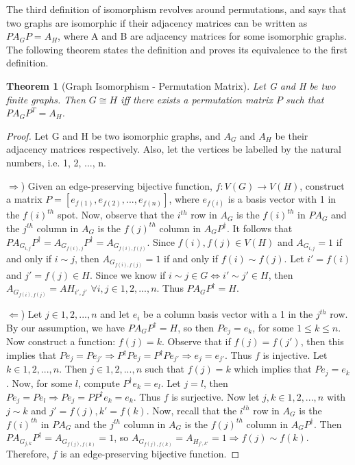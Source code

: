 \documentclass[12pt]{article}
\newtheorem{Theorem}{Theorem}
\theoremstyle{definition}
\theoremstyle{proposition}
\theoremstyle{lemma}
\begin{document}
The third definition of isomorphism revolves around permutations, and says that two graphs are isomorphic if their adjacency matrices can be written as $PA_GP = A_H$, where A and B are adjacency matrices for some isomorphic graphs. The following theorem states the definition and proves its equivalence to the first definition.

\begin{Theorem}[Graph Isomorphism - Permutation Matrix]
Let G and H be two finite graphs. Then $G \cong H$ iff there exists a permutation matrix $P$ such that $PA_GP^T = A_H$.
\end{Theorem}

\begin{proof}
Let G and H be two isomorphic graphs, and $A_G$ and $A_H$ be their adjacency matrices respectively. Also, let the vertices be labelled by the natural numbers, i.e. 1, 2, ..., n.

$\Rightarrow$) Given an edge-preserving bijective function, $f:V(G) \to V(H)$, construct a matrix $P = [e_{f(1)}, e_{f(2)}, ..., e_{f(n)}]$, where $e_{f(i)}$ is a basis vector with 1 in the $f(i)^{th}$ spot. Now, observe that the $i^{th}$ row in $A_G$ is the $f(i)^{th}$ in $PA_G$ and the $j^{th}$ column in $A_G$ is the $f(j)^{th}$ column in $A_GP^{\dag}$. It follows that $PA_{G_{i, j}}P^{\dag} = A_{G_{f(i), j}}P^{\dag} = A_{G_{f(i), f(j)}}$. Since $f(i), f(j) \in V(H)$ and $A_{G_{i, j}} = 1$ if and only if $i \sim j$, then $A_{G_{f(i), f(j)}} = 1$ if and only if $f(i) \sim f(j)$. Let $i' = f(i)$ and $j' = f(j) \in H$. Since we know if $i \sim j \in G \Leftrightarrow i' \sim j' \in H$, then $A_{G_{f(i), f(j)}} = A{H_{i', j'}}$ $\forall i, j \in 1, 2, ..., n$. Thus $PA_GP^{\dag} = H$.

$\Leftarrow$) Let $j \in 1, 2, ..., n$ and let $e_i$ be a column basis vector with a 1 in the $j^{th}$ row. By our assumption, we have $PA_GP^{\dag} = H$, so then $Pe_j = e_k$, for some $1 \leq k \leq n$. Now construct a function: $f(j) = k$. Observe that if $f(j) = f(j')$, then this implies that $Pe_j = Pe_{j'} \Rightarrow P^{\dag}Pe_j = P^{\dag}Pe_{j'} \Rightarrow e_j = e_{j'}$. Thus $f$ is injective. Let $k \in 1, 2, ..., n$. Then $j \in 1, 2, ..., n$ such that $f(j) = k$ which implies that $Pe_j = e_k$. Now, for some $l$, compute $P^{\dag}e_k = e_l$. Let $j = l$, then $Pe_j = Pe_l \Rightarrow Pe_j = PP^{\dag}e_k = e_k$. Thus $f$ is surjective. Now let $j, k \in 1, 2, ..., n$ with $j \sim k$ and $j' = f(j), k' = f(k)$. Now, recall that the $i^{th}$ row in $A_G$ is the $f(i)^{th}$ in $PA_G$ and the $j^{th}$ column in $A_G$ is the $f(j)^{th}$ column in $A_GP^{\dag}$. Then $PA_{G_{j, k}}P^{\dag} = A_{G_{f(j), f(k)}} = 1$, so $A_{G_{f(j), f(k)}} = A_{H_{j', k'}} = 1 \Rightarrow f(j) \sim f(k)$. Therefore, $f$ is an edge-preserving bijective function.

\end{proof}
\end{document}
